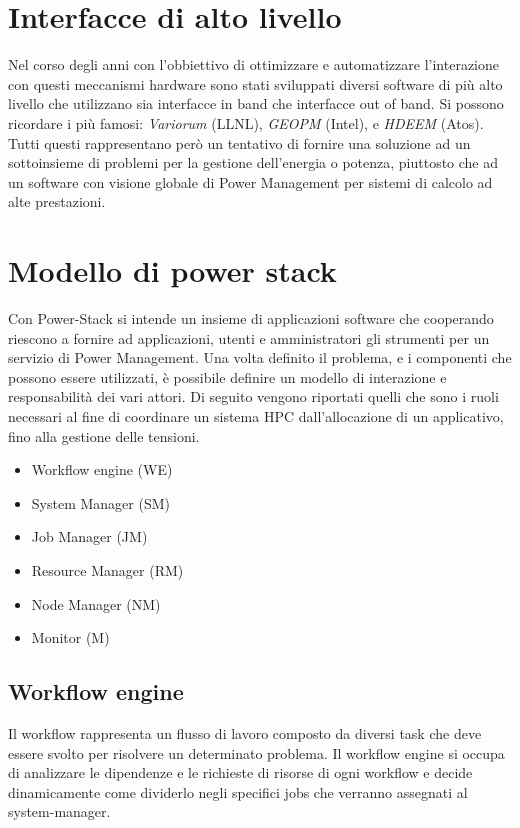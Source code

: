 \section{Interfacce di alto livello}
Nel corso degli anni con l'obbiettivo di ottimizzare e automatizzare l'interazione con questi meccanismi hardware sono stati sviluppati diversi software di più alto livello che utilizzano sia interfacce in band che interfacce out of band. Si possono ricordare i più famosi: \emph{Variorum} (LLNL), \emph{GEOPM} (Intel)\cite{GEOPM}, e \emph{HDEEM} (Atos)\cite{HDEEM}. Tutti questi rappresentano però un tentativo di fornire una soluzione ad un sottoinsieme di problemi per la gestione dell'energia o potenza, piuttosto che ad un software con visione globale di Power Management per sistemi di calcolo ad alte prestazioni. %


\section{Modello di power stack} %
Con Power-Stack si intende un insieme di applicazioni software che cooperando riescono a fornire ad applicazioni, utenti e amministratori gli strumenti per un servizio di Power Management. Una volta definito il problema, e i componenti che possono essere utilizzati, è possibile definire un modello di interazione e responsabilità dei vari attori. Di seguito vengono riportati quelli che sono i ruoli necessari al fine di coordinare un sistema HPC dall'allocazione di un applicativo, fino alla gestione delle tensioni. 
\begin{itemize}
    \item Workflow engine (WE)
    \item System Manager (SM)
    \item Job Manager (JM)
    \item Resource Manager (RM)
    \item Node Manager (NM)
    \item Monitor (M)
\end{itemize}

\subsection{Workflow engine}
Il workflow rappresenta un flusso di lavoro composto da diversi task che deve essere svolto per risolvere un determinato problema. Il workflow engine si occupa di analizzare le dipendenze e le richieste di risorse di ogni workflow e decide dinamicamente come dividerlo negli specifici jobs che verranno assegnati al system-manager. %

